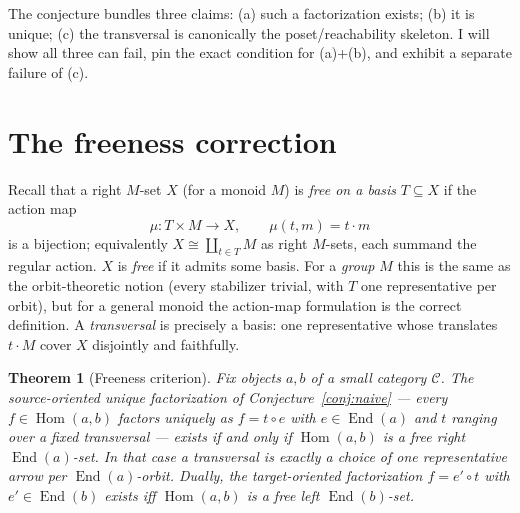 \documentclass[11pt]{article}
\newtheorem{theorem}{Theorem}
\theoremstyle{definition}
\newcommand{\Hom}{\operatorname{Hom}}
\newcommand{\End}{\operatorname{End}}
\newcommand{\C}{\mathcal{C}}
\begin{document}
The conjecture bundles three claims: (a) such a factorization exists; (b) it is
unique; (c) the transversal is canonically the poset/reachability skeleton.
I will show all three can fail, pin the exact condition for (a)+(b), and
exhibit a separate failure of (c).

\section{The freeness correction}

Recall that a right $M$-set $X$ (for a monoid $M$) is \emph{free on a basis}
$T \subseteq X$ if the action map
\[
  \mu : T \times M \longrightarrow X, \qquad \mu(t,m) = t \cdot m
\]
is a bijection; equivalently $X \cong \coprod_{t \in T} M$ as right $M$-sets,
each summand the regular action. $X$ is \emph{free} if it admits some basis. For
a \emph{group} $M$ this is the same as the orbit-theoretic notion (every
stabilizer trivial, with $T$ one representative per orbit), but for a general
monoid the action-map formulation is the correct definition. A
\emph{transversal} is precisely a basis: one representative whose translates
$t \cdot M$ cover $X$ disjointly and faithfully.

\begin{theorem}[Freeness criterion]\label{thm:main}
Fix objects $a,b$ of a small category $\C$. The source-oriented unique
factorization of Conjecture~\ref{conj:naive} ---
\emph{every $f \in \Hom(a,b)$ factors uniquely as $f = t \circ e$ with $e \in
\End(a)$ and $t$ ranging over a fixed transversal} --- exists if and only if
$\Hom(a,b)$ is a \emph{free} right $\End(a)$-set. In that case a transversal is
exactly a choice of one representative arrow per $\End(a)$-orbit. Dually, the
target-oriented factorization $f = e' \circ t$ with $e' \in \End(b)$ exists iff
$\Hom(a,b)$ is a free left $\End(b)$-set.
\end{theorem}
\end{document}
